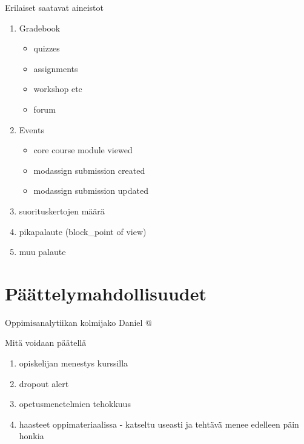 Erilaiset saatavat aineistot
\begin{enumerate}
    \item Gradebook
        \begin{itemize}
            \item quizzes
            \item assignments
            \item workshop etc
            \item forum
        \end{itemize}
    \item Events
        \begin{itemize}
            \item core course module viewed
            \item modassign submission created
            \item modassign submission updated
        \end{itemize}
    \item suorituskertojen määrä
    \item pikapalaute (block\_point of view)
    \item muu palaute
\end{enumerate}

\section{Päättelymahdollisuudet}

Oppimisanalytiikan kolmijako Daniel @ \cite{eoppimiskeskusOppimisanalytiikkaTuleeOletko2017} %

Mitä voidaan päätellä
\begin{enumerate}
    \item opiskelijan menestys kurssilla
    \item dropout alert
    \item opetusmenetelmien tehokkuus
    \item haasteet oppimateriaalissa - katseltu useasti ja tehtävä menee edelleen päin honkia
\end{enumerate}
